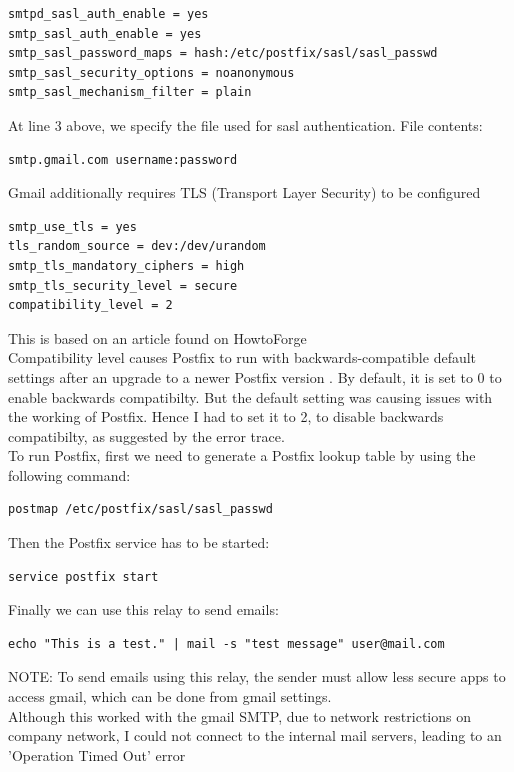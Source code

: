 \begin{lstlisting}[style=ShellStyle]
smtpd_sasl_auth_enable = yes
smtp_sasl_auth_enable = yes
smtp_sasl_password_maps = hash:/etc/postfix/sasl/sasl_passwd
smtp_sasl_security_options = noanonymous
smtp_sasl_mechanism_filter = plain
\end{lstlisting}

At line 3 above, we specify the file used for sasl authentication. File contents:
\begin{lstlisting}[style=ShellStyle]
smtp.gmail.com username:password
\end{lstlisting}

Gmail additionally requires TLS (Transport Layer Security) to be configured
\begin{lstlisting}[style=ShellStyle]
smtp_use_tls = yes
tls_random_source = dev:/dev/urandom
smtp_tls_mandatory_ciphers = high
smtp_tls_security_level = secure
compatibility_level = 2
\end{lstlisting}
This is based on an article found on HowtoForge \cite{postfix}\\

Compatibility level causes Postfix to run with backwards-compatible default settings after an upgrade to a newer Postfix version \cite{compatibility}. By default, it is set to 0 to enable backwards compatibilty. But the default setting was causing issues with the working of Postfix. Hence I had to set it to 2, to disable backwards compatibilty, as suggested by the error trace.\\

To run Postfix, first we need to generate a Postfix lookup table by using the following command:
\begin{lstlisting}[style=ShellStyle]
postmap /etc/postfix/sasl/sasl_passwd
\end{lstlisting} 
Then the Postfix service has to be started:
\begin{lstlisting}[style=ShellStyle]
service postfix start
\end{lstlisting}
Finally we can use this relay to send emails:
\begin{lstlisting}[style=ShellStyle]
echo "This is a test." | mail -s "test message" user@mail.com
\end{lstlisting}
NOTE: To send emails using this relay, the sender must allow less secure apps to access gmail, which can be done from gmail settings.\\

Although this worked with the gmail SMTP, due to network restrictions on company network, I could not connect to the internal mail servers, leading to an 'Operation Timed Out' error\\


